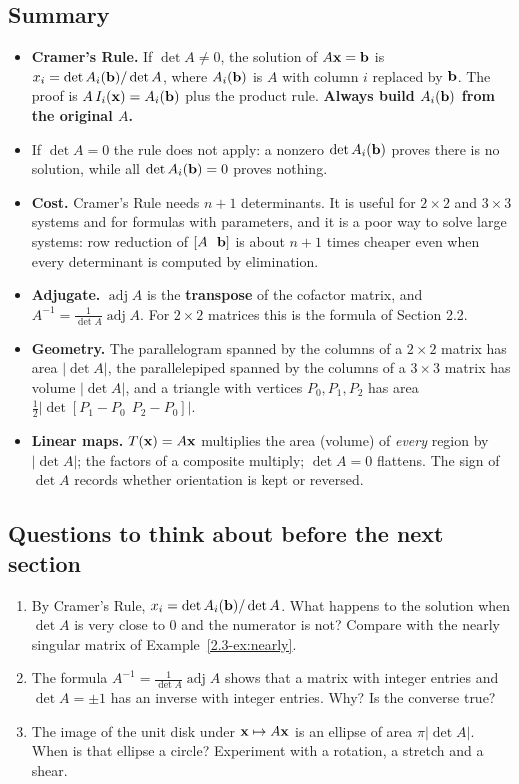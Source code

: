 \documentclass[11pt]{article}
\begin{document}
\subsection*{Summary}
\begin{itemize}
  \item \textbf{Cramer's Rule.} If $\det A\neq0$, the solution of $A\mathbf{x}=\mathbf{b}$ is $x_i=\det A_i(\mathbf{b})/\det A$, where $A_i(\mathbf{b})$ is $A$ with column $i$ replaced by $\mathbf{b}$. The proof is $A\,I_i(\mathbf{x})=A_i(\mathbf{b})$ plus the product rule. \textbf{Always build $A_i(\mathbf{b})$ from the original $A$.}
  \item If $\det A=0$ the rule does not apply: a nonzero $\det A_i(\mathbf{b})$ proves there is no solution, while all $\det A_i(\mathbf{b})=0$ proves nothing.
  \item \textbf{Cost.} Cramer's Rule needs $n+1$ determinants. It is useful for $2\times2$ and $3\times3$ systems and for formulas with parameters, and it is a poor way to solve large systems: row reduction of $[A\ \ \bv{b}]$ is about $n+1$ times cheaper even when every determinant is computed by elimination.
  \item \textbf{Adjugate.} $\operatorname{adj}A$ is the \textbf{transpose} of the cofactor matrix, and $A^{-1}=\frac1{\det A}\operatorname{adj}A$. For $2\times2$ matrices this is the formula of Section 2.2.
  \item \textbf{Geometry.} The parallelogram spanned by the columns of a $2\times2$ matrix has area $|\det A|$, the parallelepiped spanned by the columns of a $3\times3$ matrix has volume $|\det A|$, and a triangle with vertices $P_0,P_1,P_2$ has area $\tfrac12|\det[P_1-P_0\ \ P_2-P_0]|$.
  \item \textbf{Linear maps.} $T(\mathbf{x})=A\mathbf{x}$ multiplies the area (volume) of \emph{every} region by $|\det A|$; the factors of a composite multiply; $\det A=0$ flattens. The sign of $\det A$ records whether orientation is kept or reversed.
\end{itemize}

\subsection*{Questions to think about before the next section}
\begin{enumerate}
  \item By Cramer's Rule, $x_i=\det A_i(\mathbf{b})/\det A$. What happens to the solution when $\det A$ is very close to $0$ and the numerator is not? Compare with the nearly singular matrix of Example~\ref{2.3-ex:nearly}.
  \item The formula $A^{-1}=\frac1{\det A}\operatorname{adj}A$ shows that a matrix with integer entries and $\det A=\pm1$ has an inverse with integer entries. Why? Is the converse true?
  \item The image of the unit disk under $\mathbf{x}\mapsto A\mathbf{x}$ is an ellipse of area $\pi|\det A|$. When is that ellipse a circle? Experiment with a rotation, a stretch and a shear.
\end{enumerate}
\end{document}
